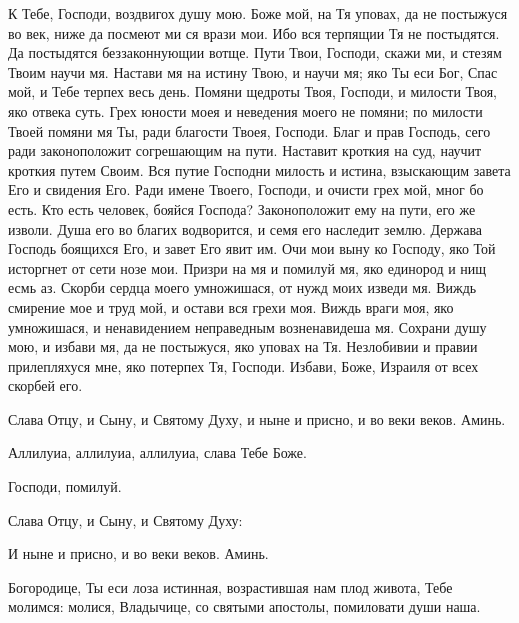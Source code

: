 \begin{mymulticols}

К Тебе, Господи, воздвигох душу мою. Боже мой, на Тя уповах, да не постыжуся во век, ниже да посмеют ми ся врази мои. Ибо вся терпящии Тя не постыдятся. Да постыдятся беззаконнующии вотще. Пути Твои, Господи, скажи ми, и стезям Твоим научи мя. Настави мя на истину Твою, и научи мя; яко Ты еси Бог, Спас мой, и Тебе терпех весь день. Помяни щедроты Твоя, Господи, и милости Твоя, яко отвека суть. Грех юности моея и неведения моего не помяни; по милости Твоей помяни мя Ты, ради благости Твоея, Господи. Благ и прав Господь, сего ради законоположит согрешающим на пути. Наставит кроткия на суд, научит кроткия путем Своим. Вся путие Господни милость и истина, взыскающим завета Его и свидения Его. Ради имене Твоего, Господи, и очисти грех мой, мног бо есть. Кто есть человек, бояйся Господа? Законоположит ему на пути, его же изволи. Душа его во благих водворится, и семя его наследит землю. Держава Господь боящихся Его, и завет Его явит им. Очи мои выну ко Господу, яко Той исторгнет от сети нозе мои. Призри на мя и помилуй мя, яко единород и нищ есмь аз. Скорби сердца моего умножишася, от нужд моих изведи мя. Виждь смирение мое и труд мой, и остави вся грехи моя. Виждь враги моя, яко умножишася, и ненавидением неправедным возненавидеша мя. Сохрани душу мою, и избави мя, да не постыжуся, яко уповах на Тя. Незлобивии и правии прилепляхуся мне, яко потерпех Тя, Господи. Избави, Боже, Израиля от всех скорбей его.



\PsalmFifty





Слава Отцу, и Сыну, и Святому Духу, и ныне и присно, и во веки веков. Аминь.

Аллилуиа, аллилуиа, аллилуиа, слава Тебе Боже. 

Господи, помилуй. 

Слава Отцу, и Сыну, и Святому Духу:




И ныне и присно, и во веки веков. Аминь.

Богородице, Ты еси лоза истинная, возрастившая нам плод живота, Тебе молимся: молися, Владычице, со святыми апостолы, помиловати души наша.

\myemph{[Если Великий пост "--- настоящий тропарь, глас 6:}


\end{mymulticols}
